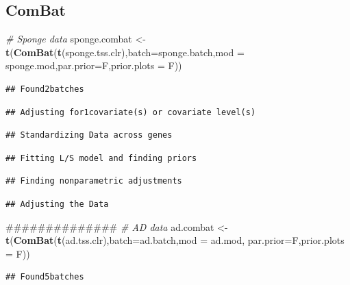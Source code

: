 \documentclass[]{book}
\newenvironment{Shaded}{\begin{snugshade}}{\end{snugshade}}
\newcommand{\KeywordTok}[1]{\textcolor[rgb]{0.13,0.29,0.53}{\textbf{#1}}}
\newcommand{\DataTypeTok}[1]{\textcolor[rgb]{0.13,0.29,0.53}{#1}}
\newcommand{\StringTok}[1]{\textcolor[rgb]{0.31,0.60,0.02}{#1}}
\newcommand{\CommentTok}[1]{\textcolor[rgb]{0.56,0.35,0.01}{\textit{#1}}}
\newcommand{\NormalTok}[1]{#1}
\begin{document}
\subsection{ComBat}\label{combat}

\begin{Shaded}
\begin{Highlighting}[]
\CommentTok{# Sponge data}
\NormalTok{sponge.combat <-}\StringTok{ }\KeywordTok{t}\NormalTok{(}\KeywordTok{ComBat}\NormalTok{(}\KeywordTok{t}\NormalTok{(sponge.tss.clr),}\DataTypeTok{batch=}\NormalTok{sponge.batch,}\DataTypeTok{mod =}\NormalTok{ sponge.mod,}\DataTypeTok{par.prior=}\NormalTok{F,}\DataTypeTok{prior.plots =}\NormalTok{ F))}
\end{Highlighting}
\end{Shaded}

\begin{verbatim}
## Found2batches
\end{verbatim}

\begin{verbatim}
## Adjusting for1covariate(s) or covariate level(s)
\end{verbatim}

\begin{verbatim}
## Standardizing Data across genes
\end{verbatim}

\begin{verbatim}
## Fitting L/S model and finding priors
\end{verbatim}

\begin{verbatim}
## Finding nonparametric adjustments
\end{verbatim}

\begin{verbatim}
## Adjusting the Data
\end{verbatim}

\begin{Shaded}
\begin{Highlighting}[]
\NormalTok{##############}
\CommentTok{# AD data}
\NormalTok{ad.combat <-}\StringTok{ }\KeywordTok{t}\NormalTok{(}\KeywordTok{ComBat}\NormalTok{(}\KeywordTok{t}\NormalTok{(ad.tss.clr),}\DataTypeTok{batch=}\NormalTok{ad.batch,}\DataTypeTok{mod =}\NormalTok{ ad.mod, }\DataTypeTok{par.prior=}\NormalTok{F,}\DataTypeTok{prior.plots =}\NormalTok{ F))}
\end{Highlighting}
\end{Shaded}

\begin{verbatim}
## Found5batches
\end{verbatim}
\end{document}
